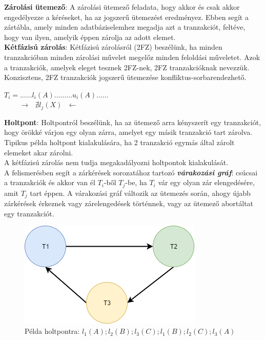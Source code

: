\documentclass[12pt,margin=0px]{article}
\begin{document}

	\noindent \textbf{Zárolási ütemező}: A zárolási ütemező feladata, hogy akkor és csak akkor engedélyezze a kéréseket, ha
	az jogszerű ütemezést eredményez. Ebben segít a zártábla, amely minden adatbáziselemhez megadja azt a tranzakciót, feltéve, hogy
	van ilyen, amelyik éppen zárolja az adott elemet.\\
	
	\noindent \textbf{Kétfázisú zárolás}: Kétfázisú zárolásról (2FZ) beszélünk, ha minden tranzakcióban minden zárolási művelet
	megelőz minden feloldási műveletet. Azok a tranzakciók, amelyek eleget tesznek 2FZ-nek, 2FZ tranzakcióknak nevezzük. Konzisztens,
	2FZ tranzakciók	jogszerű ütemezése konfliktus-sorbarendezhető.\\

    \begin{center}
        $T_{i} = …… l_{i}(A) ……… u_{i}(A) ……$ \\
        $ \ \ \ \quad \ \ \rightarrow \ \ \ \nexists l_{j}(X) \ \ \ \leftarrow $
    \end{center}
	
    \noindent \textbf{Holtpont}: Holtpontról beszélünk, ha az ütemező arra kényszerít egy tranzakciót, hogy örökké várjon egy olyan zárra, amelyet egy másik tranzakció tart zárolva. Tipikus példa holtpont kialakulására, ha 2 tranzakció egymás által zárolt 	elemeket akar zárolni.\\
    A kétfázisú zárolás nem tudja megakadályozni holtpontok kialakulását.\\

    \noindent A felismerésben segít a zárkérések sorozatához tartozó \emph{\textbf{várakozási gráf}}: csúcsai a tranzakciók és akkor van él $T_i$-ből $T_j$-be, ha $T_i$ vár egy olyan zár elengedésére, amit $T_j$ tart éppen. A várakozási gráf változik az ütemezés során, ahogy újabb zárkérések érkeznek vagy zárelengedések történnek, vagy az ütemező abortáltat egy tranzakciót.

	\begin{figure}[H]
		\centering
		\includegraphics[width=0.4\linewidth]{img/deadlock}
		\caption{Példa holtpontra: $l_{1}(A); l_{2}(B); l_{3}(C); l_{1}(B); l_{2}(C); l_{3}(A)$}
		\label{fig:deadlock}
	\end{figure}
	
\end{document}
